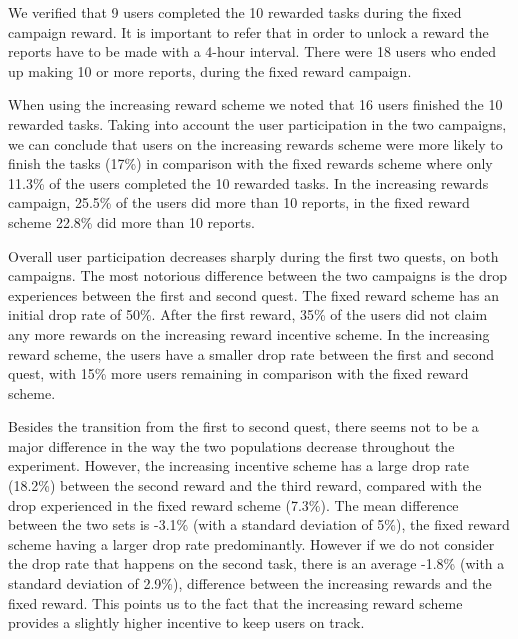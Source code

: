 \documentclass[letterpaper]{article}
\begin{document}
We verified that 9 users completed the 10 rewarded tasks during the fixed campaign reward. It is important to refer that in order to unlock a reward the reports have to be made with a 4-hour interval. There were 18 users who ended up making 10 or more reports, during the fixed reward campaign.

When using the increasing reward scheme we noted that 16 users finished the 10 rewarded tasks. Taking into account the user participation in the two campaigns, we can conclude that users on the increasing rewards scheme were more likely to finish the tasks (17\%) in comparison with the fixed rewards scheme where only 11.3\% of the users completed the 10 rewarded tasks.
In the increasing rewards campaign, 25.5\% of the users did more than 10 reports, in the fixed reward scheme 22.8\% did more than 10 reports.



Overall user participation decreases sharply during the first two quests, on both campaigns.
The most notorious difference between the two campaigns is the drop experiences between the first and second quest. 
The fixed reward scheme has an initial drop rate of 50\%. After the first reward, 35\% of the users did not claim any more rewards on the increasing reward incentive scheme.  
In the increasing reward scheme, the users have a smaller drop rate between the first and second quest, with 15\% more users remaining in comparison with the fixed reward scheme.

Besides the transition from the first to second quest, there seems not to be a major difference in the way the two populations decrease throughout the experiment. 
However, the increasing incentive scheme has a large drop rate (18.2\%) between the second reward and the third reward, compared with the drop experienced in the fixed reward scheme (7.3\%). 
The mean difference between the two sets is -3.1\% (with a standard deviation of 5\%), the fixed reward scheme having a larger drop rate predominantly. However if we do not consider the drop rate that happens on the second task, there is an average -1.8\% (with a standard deviation of 2.9\%), difference between the increasing rewards and the fixed reward. This points us to the fact that the increasing reward scheme provides a slightly higher incentive to keep users on track.
\end{document}

